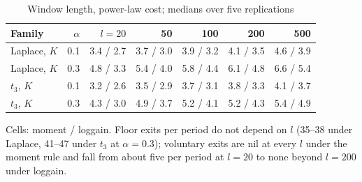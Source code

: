 \begin{table}[htbp]
\centering
\caption{Window length, power-law cost; medians over five replications}
\label{tab:window}
\small
\begin{tabular}{lrrrrrr}
\toprule
Family & $\alpha$ & $l = 20$ & 50 & 100 & 200 & 500 \\
\midrule
Laplace, $K$ & 0.1 & 3.4 / 2.7 & 3.7 / 3.0 & 3.9 / 3.2 & 4.1 / 3.5 & 4.6 / 3.9 \\
Laplace, $K$ & 0.3 & 4.8 / 3.3 & 5.4 / 4.0 & 5.8 / 4.4 & 6.1 / 4.8 & 6.6 / 5.4 \\
$t_3$, $K$ & 0.1 & 3.2 / 2.6 & 3.5 / 2.9 & 3.7 / 3.1 & 3.8 / 3.3 & 4.1 / 3.7 \\
$t_3$, $K$ & 0.3 & 4.3 / 3.0 & 4.9 / 3.7 & 5.2 / 4.1 & 5.2 / 4.3 & 5.4 / 4.9 \\
\bottomrule
\end{tabular}
\par\smallskip\begin{minipage}{0.95\linewidth}\footnotesize Cells: moment / loggain. Floor exits per period do not depend on $l$ (35--38 under Laplace, 41--47 under $t_3$ at $\alpha = 0.3$); voluntary exits are nil at every $l$ under the moment rule and fall from about five per period at $l = 20$ to none beyond $l = 200$ under loggain.\end{minipage}
\end{table}
